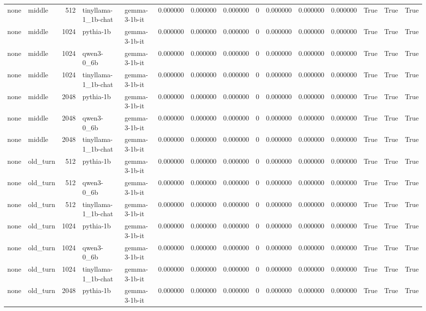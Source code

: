 \begin{tabular}{llrllrrrrrrrrrr}
none & middle & 512 & tinyllama-1_1b-chat & gemma-3-1b-it & 0.000000 & 0.000000 & 0.000000 & 0 & 0.000000 & 0.000000 & 0.000000 & True & True & True \\
none & middle & 1024 & pythia-1b & gemma-3-1b-it & 0.000000 & 0.000000 & 0.000000 & 0 & 0.000000 & 0.000000 & 0.000000 & True & True & True \\
none & middle & 1024 & qwen3-0_6b & gemma-3-1b-it & 0.000000 & 0.000000 & 0.000000 & 0 & 0.000000 & 0.000000 & 0.000000 & True & True & True \\
none & middle & 1024 & tinyllama-1_1b-chat & gemma-3-1b-it & 0.000000 & 0.000000 & 0.000000 & 0 & 0.000000 & 0.000000 & 0.000000 & True & True & True \\
none & middle & 2048 & pythia-1b & gemma-3-1b-it & 0.000000 & 0.000000 & 0.000000 & 0 & 0.000000 & 0.000000 & 0.000000 & True & True & True \\
none & middle & 2048 & qwen3-0_6b & gemma-3-1b-it & 0.000000 & 0.000000 & 0.000000 & 0 & 0.000000 & 0.000000 & 0.000000 & True & True & True \\
none & middle & 2048 & tinyllama-1_1b-chat & gemma-3-1b-it & 0.000000 & 0.000000 & 0.000000 & 0 & 0.000000 & 0.000000 & 0.000000 & True & True & True \\
none & old_turn & 512 & pythia-1b & gemma-3-1b-it & 0.000000 & 0.000000 & 0.000000 & 0 & 0.000000 & 0.000000 & 0.000000 & True & True & True \\
none & old_turn & 512 & qwen3-0_6b & gemma-3-1b-it & 0.000000 & 0.000000 & 0.000000 & 0 & 0.000000 & 0.000000 & 0.000000 & True & True & True \\
none & old_turn & 512 & tinyllama-1_1b-chat & gemma-3-1b-it & 0.000000 & 0.000000 & 0.000000 & 0 & 0.000000 & 0.000000 & 0.000000 & True & True & True \\
none & old_turn & 1024 & pythia-1b & gemma-3-1b-it & 0.000000 & 0.000000 & 0.000000 & 0 & 0.000000 & 0.000000 & 0.000000 & True & True & True \\
none & old_turn & 1024 & qwen3-0_6b & gemma-3-1b-it & 0.000000 & 0.000000 & 0.000000 & 0 & 0.000000 & 0.000000 & 0.000000 & True & True & True \\
none & old_turn & 1024 & tinyllama-1_1b-chat & gemma-3-1b-it & 0.000000 & 0.000000 & 0.000000 & 0 & 0.000000 & 0.000000 & 0.000000 & True & True & True \\
none & old_turn & 2048 & pythia-1b & gemma-3-1b-it & 0.000000 & 0.000000 & 0.000000 & 0 & 0.000000 & 0.000000 & 0.000000 & True & True & True \\

\end{tabular}
